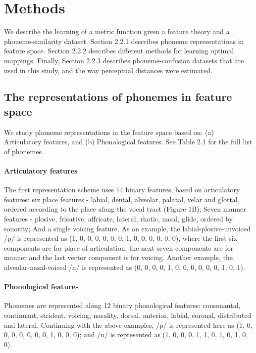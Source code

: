 \section{Methods}
We describe the learning of a metric function given a feature theory and a phoneme-similarity dataset. Section 2.2.1 describes phoneme representations in feature space. Section 2.2.2 describes different methods for learning optimal mappings. Finally, Section 2.2.3 describes phoneme-confusion datasets that are used in this study, and the way perceptual distances were estimated.

\subsection{The representations of phonemes in feature space}
We study phoneme representations in the feature space based on: (a) Articulatory features, and (b) Phonological features. See Table 2.1 for the full list of phonemes.

\paragraph{Articulatory features} The first representation scheme uses 14 binary features, based on articulatory features: six place features - labial, dental, alveolar, palatal, velar and glottal, ordered according to the place along the vocal tract (Figure 1B); Seven manner features - plosive, fricative, affricate, lateral, rhotic, nasal, glide, ordered by sonority; And a single voicing feature. As an example, the labial-plosive-unvoiced /p/ is represented  as (1, 0, 0, 0, 0, 0, 0, 1, 0, 0, 0, 0, 0, 0), where the first six components are for place of articulation, the next seven components are for manner and the last vector component is for voicing. Another example, the alveolar-nasal-voiced /n/ is represented as (0, 0, 0, 0, 1, 0, 0, 0, 0, 0, 0, 1, 0, 1).

\paragraph{Phonological features} Phonemes are represented along 12 binary phonological features: consonantal, continuant, strident, voicing, nasality, dorsal, anterior, labial, coronal, distributed and lateral. Continuing with the above examples, /p/ is represented here as (1, 0, 0, 0, 0, 0, 0, 0, 1, 0, 0, 0); and /n/ is represented as (1, 0, 0, 0, 1, 1, 0, 1, 0, 1, 0, 0). \mbox{} \\

